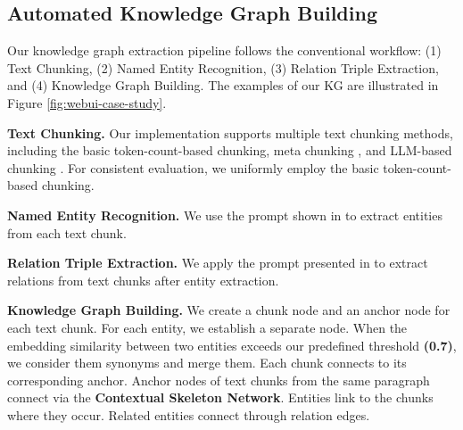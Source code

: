\subsection{Automated Knowledge Graph Building}
\label{appendix::kg-building}

Our knowledge graph extraction pipeline follows the conventional workflow: (1) Text Chunking, (2) Named Entity Recognition, (3) Relation Triple Extraction, and (4) Knowledge Graph Building. The examples of our KG are illustrated in Figure \ref{fig:webui-case-study}.

\textbf{Text Chunking.} Our implementation supports multiple text chunking methods, including the basic token-count-based chunking, meta chunking \cite{Chunk3}, and LLM-based chunking \cite{agentic-chunking}. For consistent evaluation, we uniformly employ the basic token-count-based chunking.

\textbf{Named Entity Recognition.} We use the prompt shown in  to extract entities from each text chunk.

\textbf{Relation Triple Extraction.} We apply the prompt presented in  to extract relations from text chunks after entity extraction.

\textbf{Knowledge Graph Building.} We create a chunk node and an anchor node for each text chunk. For each entity, we establish a separate node. When the embedding similarity between two entities exceeds our predefined threshold \textbf{(0.7)}, we consider them synonyms and merge them. Each chunk connects to its corresponding anchor. Anchor nodes of text chunks from the same paragraph connect via the \textbf{Contextual Skeleton Network}. Entities link to the chunks where they occur. Related entities connect through relation edges.

